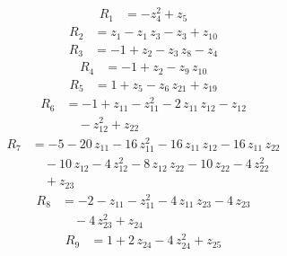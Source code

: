 \begin{equation*}\begin{aligned}
R_{1}&=-z_{4}^{2} +z_{5}
\end{aligned}\end{equation*}
\begin{equation*}\begin{aligned}
R_{2}&=z_{1} -z_{1}\,z_{3} -z_{3} +z_{10}
\end{aligned}\end{equation*}
\begin{equation*}\begin{aligned}
R_{3}&=-1 +z_{2} -z_{3}\,z_{8} -z_{4}
\end{aligned}\end{equation*}
\begin{equation*}\begin{aligned}
R_{4}&=-1 +z_{2} -z_{9}\,z_{10}
\end{aligned}\end{equation*}
\begin{equation*}\begin{aligned}
R_{5}&=1 +z_{5} -z_{6}\,z_{21} +z_{19}
\end{aligned}\end{equation*}
\begin{equation*}\begin{aligned}
R_{6}&=-1 +z_{11} -z_{11}^{2} -2\,z_{11}\,z_{12} -z_{12} \\
&\quad -z_{12}^{2} +z_{22}
\end{aligned}\end{equation*}
\begin{equation*}\begin{aligned}
R_{7}&=-5 -20\,z_{11} -16\,z_{11}^{2} -16\,z_{11}\,z_{12} -16\,z_{11}\,z_{22} \\
&\quad -10\,z_{12} -4\,z_{12}^{2} -8\,z_{12}\,z_{22} -10\,z_{22} -4\,z_{22}^{2} \\
&\quad +z_{23}
\end{aligned}\end{equation*}
\begin{equation*}\begin{aligned}
R_{8}&=-2 -z_{11} -z_{11}^{2} -4\,z_{11}\,z_{23} -4\,z_{23} \\
&\quad -4\,z_{23}^{2} +z_{24}
\end{aligned}\end{equation*}
\begin{equation*}\begin{aligned}
R_{9}&=1 +2\,z_{24} -4\,z_{24}^{2} +z_{25}
\end{aligned}\end{equation*}
